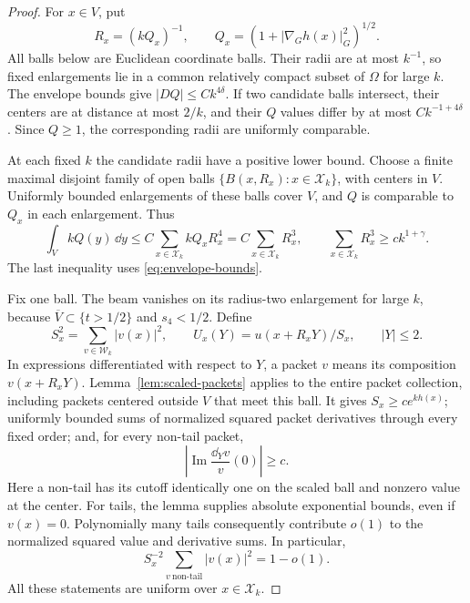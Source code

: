 \begin{proof}
For $x\in V$, put
\begin{equation}\label{eq:sign-radius}
 R_x=(kQ_x)^{-1},\qquad Q_x=(1+|\nabla_G h(x)|_G^2)^{1/2}.
\end{equation}
All balls below are Euclidean coordinate balls. Their radii are at
most $k^{-1}$, so fixed enlargements lie in a common relatively
compact subset of $\Omega$ for large $k$. The envelope bounds give
$|DQ|\le Ck^{4\delta}$. If two candidate balls intersect, their
centers are at distance at most $2/k$, and their $Q$ values differ
by at most $Ck^{-1+4\delta}$. Since $Q\ge1$, the corresponding
radii are uniformly comparable.

At each fixed $k$ the candidate radii have a positive lower bound.
Choose a finite maximal disjoint family of open balls
$\{B(x,R_x):x\in\mathcal X_k\}$, with centers in $V$.
Uniformly bounded enlargements of these balls cover $V$, and $Q$ is
comparable to $Q_x$ in each enlargement. Thus
\begin{equation}\label{eq:weighted-packing}
 \int_V kQ(y)\,\dd y
 \le C\sum_{x\in\mathcal X_k}kQ_xR_x^4
 =C\sum_{x\in\mathcal X_k}R_x^3,
 \qquad
 \sum_{x\in\mathcal X_k}R_x^3\ge c k^{1+\gamma}.
\end{equation}
The last inequality uses \eqref{eq:envelope-bounds}.

Fix one ball. The beam vanishes on its radius-two enlargement for
large $k$, because $\overline V\subset\{t>1/2\}$ and $s_4<1/2$.
Define
\[
 S_x^2=\sum_{v\in\mathcal W_k}|v(x)|^2,
 \qquad U_x(Y)=u(x+R_xY)/S_x,\qquad |Y|\le2.
\]
In expressions differentiated with respect to $Y$, a packet $v$
means its composition $v(x+R_xY)$.
Lemma~\ref{lem:scaled-packets} applies to the entire packet
collection, including packets centered outside $V$ that meet this
ball. It gives $S_x\ge ce^{kh(x)}$; uniformly bounded sums of
normalized squared packet derivatives through every fixed order;
and, for every non-tail packet,
\begin{equation}\label{eq:local-imaginary-lower}
 \left|\operatorname{Im}\frac{\dd_Yv}{v}(0)\right|\ge c.
\end{equation}
Here a non-tail has its cutoff identically one on the scaled ball
and nonzero value at the center. For tails, the lemma supplies
absolute exponential bounds, even if $v(x)=0$. Polynomially many
tails consequently contribute $o(1)$ to the normalized squared
value and derivative sums. In particular,
\begin{equation}\label{eq:non-tail-mass}
 S_x^{-2}\sum_{v\ \mathrm{non\text{-}tail}}|v(x)|^2=1-o(1).
\end{equation}
All these statements are uniform over $x\in\mathcal X_k$.


\end{proof}
